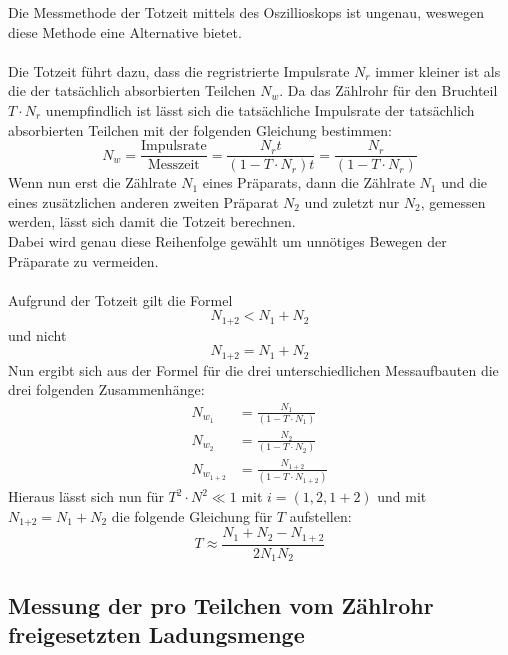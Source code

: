 \noindent
Die Messmethode der Totzeit mittels des Oszillioskops ist ungenau, weswegen diese Methode eine Alternative bietet.\\\\
Die Totzeit führt dazu, dass die regristrierte Impulsrate $N_r$ immer kleiner ist als die der tatsächlich absorbierten Teilchen $N_w$.
Da das Zählrohr für den Bruchteil $T\cdot N_r $ unempfindlich ist lässt sich die tatsächliche Impulsrate der tatsächlich absorbierten Teilchen mit der folgenden Gleichung bestimmen:
\begin{equation}
    N_w=\frac{\text{Impulsrate}}{\text{Messzeit}}=\frac{N_r t}{(1-T \cdot N_r)t}=\frac{N_r }{(1-T \cdot N_r)}
    \label{eqn:imp}
\end{equation}
Wenn nun erst die Zählrate $N_1$ eines Präparats, dann die Zählrate $N_1$ und die eines zusätzlichen anderen zweiten Präparat $N_2$ und zuletzt nur $N_2$, gemessen werden, lässt sich damit die Totzeit berechnen.\\
Dabei wird genau diese Reihenfolge gewählt um unnötiges Bewegen  der Präparate zu vermeiden.\\\\
Aufgrund der Totzeit gilt die Formel
\begin{equation*}
    N_\text{1+2}<N_1 +N_2
\end{equation*}
und nicht
\begin{equation*}
    N_\text{1+2}=N_1 +N_2
\end{equation*}
Nun ergibt sich aus der Formel  für die drei unterschiedlichen Messaufbauten die drei folgenden Zusammenhänge:
\begin{align*}
    N_{w_1} &=\frac{N_1 }{(1-T \cdot N_1)}\\
    N_{w_2} &=\frac{N_2 }{(1-T \cdot N_2)}\\
    N_{w_{1+2}} &=\frac{N_{1+2} }{(1-T \cdot N_{1+2})}
\end{align*}
Hieraus lässt sich nun für $T^2\cdot N^2 \ll 1$ mit $i=(1,2,1+2)$ und mit $N_\text{1+2}=N_1 +N_2$ die folgende Gleichung für $T$ aufstellen:
\begin{equation*}
    T\approx \frac{N_1 +N_2 -N_{{1+2}} }{2 N_1 N_2}
\end{equation*}

\subsection{Messung der pro Teilchen vom Zählrohr freigesetzten Ladungsmenge}



